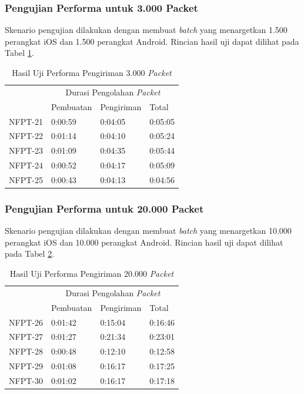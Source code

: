 \subsubsection{Pengujian Performa untuk 3.000 Packet}
\par Skenario pengujian dilakukan dengan membuat \textit{batch} yang menargetkan 1.500 perangkat iOS dan 1.500 perangkat Android. Rincian hasil uji dapat dilihat pada Tabel \ref{t:performa-3k}.

\begin{longtable}{|p{1.5cm}|p{2cm}|p{2cm}|p{2cm}|}
	\caption{Hasil Uji Performa Pengiriman 3.000 \textit{Packet}} \label{t:performa-3k} \\ \hline
	\rowcolor{lightgray} & \multicolumn{3}{c|}{Durasi Pengolahan \textit{Packet}} \\ \hhline{~|*3{-}|}
	\rowcolor{lightgray} \multirow{-2}{*}{Kode} & Pembuatan & Pengiriman & Total \\ \hline
	\endhead
	NFPT-21 & 0:00:59 & 0:04:05 & 0:05:05 \\ \hline 
	NFPT-22 & 0:01:14 & 0:04:10 & 0:05:24 \\ \hline
	NFPT-23 & 0:01:09 & 0:04:35 & 0:05:44 \\ \hline
	NFPT-24 & 0:00:52 & 0:04:17 & 0:05:09 \\ \hline
	NFPT-25 & 0:00:43 & 0:04:13 & 0:04:56 \\ \hline
\end{longtable}

\subsubsection{Pengujian Performa untuk 20.000 Packet}
\par Skenario pengujian dilakukan dengan membuat \textit{batch} yang menargetkan 10.000 perangkat iOS dan 10.000 perangkat Android. Rincian hasil uji dapat dilihat pada Tabel \ref{t:performa-20k}.
\begin{longtable}{|p{1.5cm}|p{2cm}|p{2cm}|p{2cm}|}
	\caption{Hasil Uji Performa Pengiriman 20.000 \textit{Packet}} \label{t:performa-20k} \\ \hline
	\rowcolor{lightgray} & \multicolumn{3}{c|}{Durasi Pengolahan \textit{Packet}} \\ \hhline{~|*3{-}|}
	\rowcolor{lightgray} \multirow{-2}{*}{Kode} & Pembuatan & Pengiriman & Total \\ \hline
	\endhead
	NFPT-26 & 0:01:42 & 0:15:04 & 0:16:46 \\ \hline 
	NFPT-27 & 0:01:27 & 0:21:34 & 0:23:01 \\ \hline
	NFPT-28 & 0:00:48 & 0:12:10 & 0:12:58 \\ \hline
	NFPT-29 & 0:01:08 & 0:16:17 & 0:17:25 \\ \hline
	NFPT-30 & 0:01:02 & 0:16:17 & 0:17:18 \\ \hline
\end{longtable}

